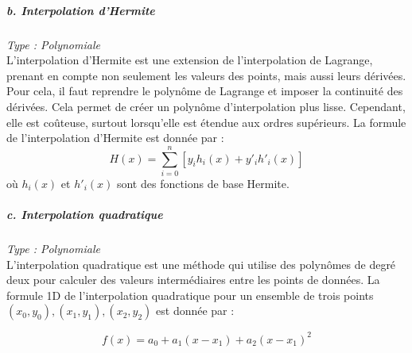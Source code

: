 

\subparagraph{b. Interpolation d'Hermite \cite{bajaj}}
\textit{Type : Polynomiale} \\
L'interpolation d'Hermite est une extension de l'interpolation de Lagrange, prenant en compte non seulement les valeurs des points, mais aussi leurs dérivées. Pour cela, il faut reprendre le polynôme de Lagrange et imposer la continuité des dérivées. Cela permet de créer un polynôme d'interpolation plus lisse. Cependant, elle est coûteuse, surtout lorsqu'elle est étendue aux ordres supérieurs. La formule de l'interpolation d'Hermite est donnée par :
\begin{equation}
    H(x) = \sum_{i=0}^{n} \left[ y_i h_i(x) + y'_i h'_i(x) \right]
\end{equation}
où \( h_i(x) \) et \( h'_i(x) \) sont des fonctions de base Hermite.


\subparagraph{c. Interpolation quadratique}
\textit{Type : Polynomiale} \\
L'interpolation quadratique est une méthode qui utilise des polynômes de degré deux pour calculer des valeurs intermédiaires entre les points de données.
La formule 1D de l'interpolation quadratique pour un ensemble de trois points \( (x_0, y_0), (x_1, y_1), (x_2, y_2) \) est donnée par :

\begin{equation}
    f(x) = a_0 + a_1(x - x_1) + a_2(x - x_1)^2
\end{equation}

